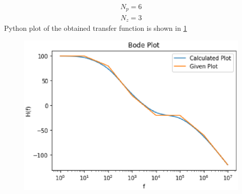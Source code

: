 \begin{enumerate}[label=\thesection.\arabic*.,ref=\thesection.\theenumi]
\begin{align}
	N_{p} = 6  
\end{align}
\begin{align}
	N_{z} = 3
\end{align}
Python plot of the obtained transfer function is shown in \ref{fig:bode}
\begin{figure}[htp]
    \centering
    \includegraphics[width=\columnwidth]{./figs/ee18btech11001/ee18btech11001_2.eps}
    \caption{}
    \label{fig:bode}
\end{figure}




\end{enumerate}
